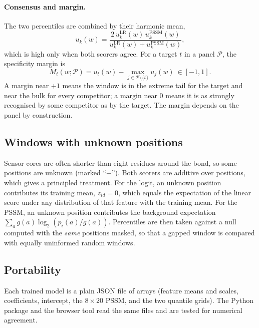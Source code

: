 \paragraph{Consensus and margin.} The two percentiles are combined by their harmonic mean,
\begin{equation}
u_k(w)=\frac{2\,u_k^{\mathrm{LR}}(w)\,u_k^{\mathrm{PSSM}}(w)}{u_k^{\mathrm{LR}}(w)+u_k^{\mathrm{PSSM}}(w)},
\label{eq:cons}
\end{equation}
which is high only when both scorers agree. For a target $t$ in a panel $\mathcal{P}$, the specificity margin is
\begin{equation}
M_t(w;\mathcal{P})=u_t(w)-\max_{j\in\mathcal{P}\setminus\{t\}}u_j(w)\ \in[-1,1].
\label{eq:margin}
\end{equation}
A margin near $+1$ means the window is in the extreme tail for the target and near the bulk for every competitor; a margin near $0$ means it is as strongly recognised by some competitor as by the target. The margin depends on the panel by construction.

\subsection{Windows with unknown positions}
Sensor cores are often shorter than eight residues around the bond, so some positions are unknown (marked ``$-$''). Both scorers are additive over positions, which gives a principled treatment. For the logit, an unknown position contributes its training mean, $z_{id}=0$, which equals the expectation of the linear score under any distribution of that feature with the training mean. For the PSSM, an unknown position contributes the background expectation $\sum_a g(a)\log_2(p_i(a)/g(a))$. Percentiles are then taken against a null computed with the \emph{same} positions masked, so that a gapped window is compared with equally uninformed random windows.

\subsection{Portability}
Each trained model is a plain JSON file of arrays (feature means and scales, coefficients, intercept, the $8\times20$ PSSM, and the two quantile grids). The Python package and the browser tool read the same files and are tested for numerical agreement.
